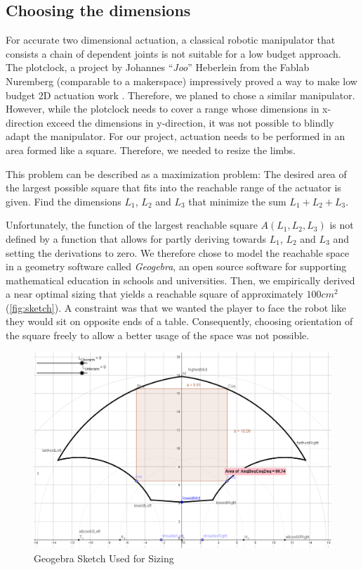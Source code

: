 \documentclass{sig-alternate-05-2015}
\begin{document}
\subsection{Choosing the dimensions}
For accurate two dimensional actuation, a classical robotic manipulator that  consists a chain of dependent joints is not suitable for a low budget approach. The plotclock, a project by Johannes ``\emph{Joo}'' Heberlein from the Fablab Nuremberg (comparable to a makerspace) impressively proved a way to make low budget 2D actuation work \cite{Joo}. Therefore, we planed to chose a similar manipulator. However, while the plotclock needs to cover a range whose dimensions in x-direction exceed the dimensions in y-direction, it was not possible to blindly adapt the manipulator. For our project, actuation needs to be performed in an area formed like a square. Therefore, we needed to resize the limbs.

This problem can be described as a maximization problem:
 The desired area of the largest possible square that fits into the reachable range of the actuator is given. Find the dimensions $L_1$, $L_2$ and $L_3$ that minimize the sum $L_1 + L_2 +L_3$.
 
 Unfortunately, the function of the largest reachable square $A(L_1, L_2, L_3)$ is not defined by a function that allows for partly deriving towards $L_1$, $L_2$ and $L_3$ and setting the derivations to zero. 
 We therefore chose to model the reachable space in a geometry software called \emph{Geogebra}, an open source software for supporting mathematical education in schools and universities\cite{Geo}. Then, we empirically derived a near optimal sizing that yields a reachable square of approximately $100 cm^2$(\autoref{fig:sketch}). A constraint was that we wanted the player to face the robot like they would sit on opposite ends of a table. Consequently, choosing orientation of the square freely to allow a better usage of the space was not possible.

 \begin{figure}
 	\centering
 	\includegraphics[width=.42\textwidth]{img/sizing.png}
    \caption{Geogebra Sketch Used for Sizing}
 \end{figure}
\end{document}
